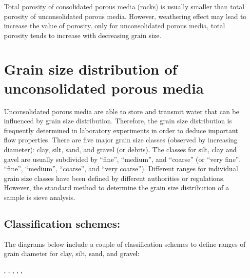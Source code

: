 \documentclass[letterpaper,10pt,english]{sphinxmanual}
\let\sphinxpxdimen\pdfpxdimen\else\newdimen\sphinxpxdimen
\begin{document}
Total porosity of consolidated porous media (rocks) is usually smaller than total porosity of unconsolidated porous media. However, weathering effect may lead to increase the value of porosity.
only for unconsolidated porous media, total porosity tends to increase with decreasing grain size.


\section{Grain size distribution of unconsolidated porous media}
\label{\detokenize{contents/flow/12_subsurface_structure:grain-size-distribution-of-unconsolidated-porous-media}}
Unconsolidated porous media are able to store and transmit water that can be influenced by grain size distribution. Therefore, the grain size distribution is frequently determined in laboratory experiments in order to deduce important flow properties.
There are five major grain size classes (observed by increasing diameter): clay, silt, sand, and gravel (or debris). The classes for silt, clay and gavel are usually subdivided by “fine”, “medium”, and “coarse” (or “very fine”, “fine”, “medium”, “coarse”, and “very coarse”). Different ranges for individual grain size classes have been defined by different authorities or regulations. However, the standard method to determine the grain size distribution of a sample is sieve analysis.


\subsection{Classification schemes:}
\label{\detokenize{contents/flow/12_subsurface_structure:classification-schemes}}
The diagrams below include a couple of classification schemes to define ranges of grain diameter for clay, silt, sand, and gravel:

\noindent{\hspace*{\fill}\sphinxincludegraphics[height=400\sphinxpxdimen]{{L02_fig7}.png}\hspace*{\fill}}

, , , , , 
\end{document}
